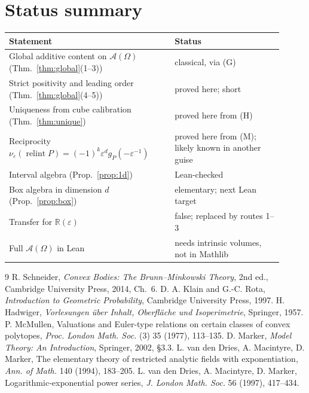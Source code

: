 \documentclass[11pt]{article}
\theoremstyle{definition}
\theoremstyle{remark}
\newcommand{\R}{\mathbb R}
\newcommand{\eps}{\varepsilon}
\newcommand{\A}{\mathcal A}
\newcommand{\nuE}{\nu_{\eps}}
\newcommand{\relint}{\operatorname{relint}}
\begin{document}
\section*{Status summary}
\begin{center}
\begin{tabular}{p{0.55\linewidth}p{0.36\linewidth}}
\toprule
Statement & Status \\
\midrule
Global additive content on $\A(\Omega)$ (Thm.~\ref{thm:global}(1--3)) &
classical, via (G) \\
Strict positivity and leading order (Thm.~\ref{thm:global}(4--5)) &
proved here; short \\
Uniqueness from cube calibration (Thm.~\ref{thm:unique}) & proved here
from (H) \\
Reciprocity $\nuE(\relint P)=(-1)^k\eps^dg_P(-\eps^{-1})$ & proved here
from (M); likely known in another guise \\
Interval algebra (Prop.~\ref{prop:1d}) & Lean-checked \\
Box algebra in dimension $d$ (Prop.~\ref{prop:box}) & elementary; next
Lean target \\
Transfer for $\R(\eps)$ & false; replaced by routes 1--3 \\
Full $\A(\Omega)$ in Lean & needs intrinsic volumes, not in Mathlib \\
\bottomrule
\end{tabular}
\end{center}

\begin{thebibliography}{9}
 R. Schneider, \emph{Convex Bodies: The
Brunn--Minkowski Theory}, 2nd ed., Cambridge University Press, 2014,
Ch.~6.
 D. A. Klain and G.-C. Rota, \emph{Introduction to
Geometric Probability}, Cambridge University Press, 1997.
 H. Hadwiger, \emph{Vorlesungen \"uber Inhalt,
Oberfl\"ache und Isoperimetrie}, Springer, 1957.
 P. McMullen, Valuations and Euler-type relations on
certain classes of convex polytopes, \emph{Proc. London Math. Soc.} (3)
35 (1977), 113--135.
 D. Marker, \emph{Model Theory: An Introduction},
Springer, 2002, \S3.3.
 L. van den Dries, A. Macintyre, D. Marker, The elementary
theory of restricted analytic fields with exponentiation, \emph{Ann. of
Math.} 140 (1994), 183--205.
 L. van den Dries, A. Macintyre, D. Marker,
Logarithmic-exponential power series, \emph{J. London Math. Soc.} 56
(1997), 417--434.
\end{thebibliography}
\end{document}
